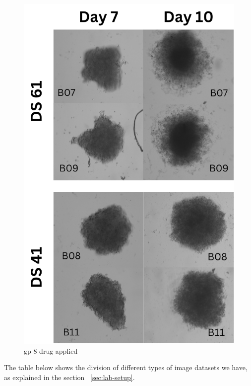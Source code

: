 \begin{figure}[H]
  \centering
  \includegraphics[scale=0.5]{figures/drug_eff.png} 
  \caption{gp 8 drug applied}
  \label{fig:drug_eff}
\end{figure}


The table below shows the division of different types of image datasets we have, as  explained in the section ~\ref{sec:lab-setup}.
\begin{table}[ht!]
  \centering
  \caption{Dataset Class Overview}
  \label{tab:dataset}
\end{table}



